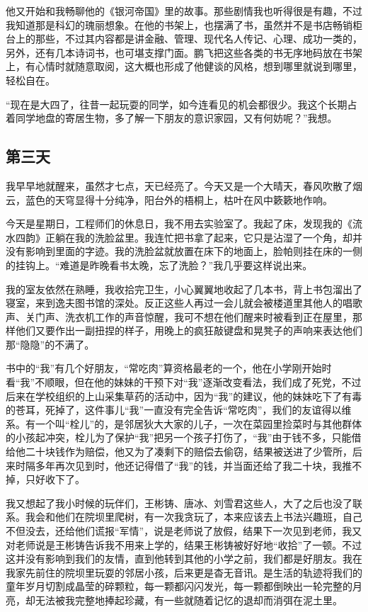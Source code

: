 \documentclass[openany,scheme = chinese, linespread = 1.5]{ctexbook}
\begin{document}
他又开始和我畅聊他的《银河帝国》里的故事。那些剧情我也听得很是有趣，不过我知道那是科幻的瑰丽想象。在他的书架上，也摆满了书，虽然并不是书店畅销柜台上的那些，不过其内容都是讲金融、管理、现代名人传记、心理、成功一类的，另外，还有几本诗词书，也可堪支撑门面。鹏飞把这些各类的书无序地码放在书架上，有心情时就随意取阅，这大概也形成了他健谈的风格，想到哪里就说到哪里，轻松自在。

“现在是大四了，往昔一起玩耍的同学，如今连看见的机会都很少。我这个长期占着同学地盘的寄居生物，多了解一下朋友的意识家园，又有何妨呢？”我想。

\subsection*{第三天}

我早早地就醒来，虽然才七点，天已经亮了。今天又是一个大晴天，春风吹散了烟云，蓝色的天穹显得十分纯净，阳台外的梧桐上，枯叶在风中簌簌地作响。

今天是星期日，工程师们的休息日，我不用去实验室了。我起了床，发现我的《流水四韵》正躺在我的洗脸盆里。我连忙把书拿了起来，它只是沾湿了一个角，却并没有影响到里面的字迹。我的洗脸盆就放置在床下的地面上，脸帕则挂在床的一侧的挂钩上。“难道是昨晚看书太晚，忘了洗脸？”我几乎要这样说出来。

我的室友依然在熟睡，我收拾完卫生，小心翼翼地收起了几本书，背上书包溜出了寝室，来到逸夫图书馆的深处。反正这些人再过一会儿就会被楼道里其他人的唱歌声、关门声、洗衣机工作的声音惊醒，我可不想在他们醒来时被看到正在屋里，那样他们又要作出一副扭捏的样子，用晚上的疯狂敲键盘和晃凳子的声响来表达他们那“隐隐”的不满了。

书中的“我”有几个好朋友，“常吃肉”算资格最老的一个，他在小学刚开始时看“我”不顺眼，但在他的妹妹的干预下对“我”逐渐改变看法，我们成了死党，不过后来在学校组织的上山采集草药的活动中，因为“我”的建议，他的妹妹吃下了有毒的苍耳，死掉了，这件事儿“我”一直没有完全告诉“常吃肉”，我们的友谊得以维系。有一个叫“栓儿”的，是邻居狄大大家的儿子，一次在菜园里捡菜时与其他群体的小孩起冲突，栓儿为了保护“我”把另一个孩子打伤了，“我”由于钱不多，只能借给他二十块钱作为赔偿，他又为了凑剩下的赔偿去偷窃，结果被送进了少管所，后来时隔多年再次见到时，他还记得借了“我”的钱，并当面还给了我二十块，我推不掉，只好收下了。

我又想起了我小时候的玩伴们，王彬铸、唐冰、刘雪君这些人，大了之后也没了联系。我会和他们在院坝里爬树，有一次我贪玩了，本来应该去上书法兴趣班，自己不但没去，还给他们谎报“军情”，说是老师说了放假，结果下一次见到老师，我又对老师说是王彬铸告诉我不用来上学的，结果王彬铸被好好地“收拾”了一顿。不过这并没有影响到我们的友情，直到他转到其他的小学之前，我们都是好朋友。我在我家先前住的院坝里玩耍的邻居小孩，后来更是杳无音讯。是生活的轨迹将我们的童年岁月切割成晶莹的碎颗粒，每一颗都闪闪发光，每一颗都倒映出一轮完整的月亮，却无法被我完整地捧起珍藏，有一些就随着记忆的退却而消弭在泥土里。
\end{document}

